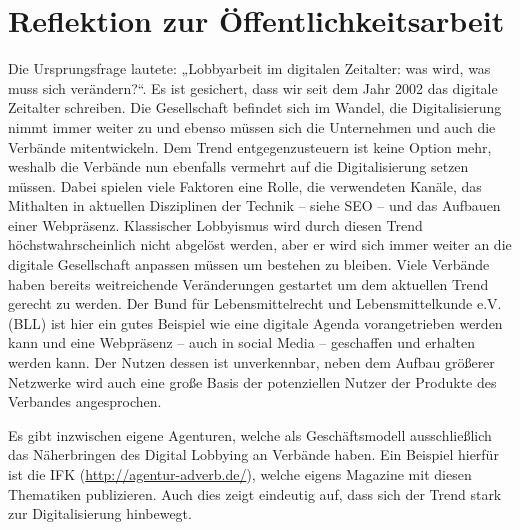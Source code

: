 \documentclass[12pt,a4paper,bibliography=totocnumbered,listof=totocnumbered]{scrartcl}
\begin{document}
\pagebreak

\section{Reflektion zur Öffentlichkeitsarbeit}

Die Ursprungsfrage lautete: „Lobbyarbeit im digitalen Zeitalter: was wird, was muss sich verändern?“. Es ist gesichert, dass wir seit dem Jahr 2002 das digitale Zeitalter schreiben. Die Gesellschaft befindet sich im Wandel, die Digitalisierung nimmt immer weiter zu und ebenso müssen sich die Unternehmen und auch die Verbände mitentwickeln. Dem Trend entgegenzusteuern ist keine Option mehr, weshalb die Verbände nun ebenfalls vermehrt auf die Digitalisierung setzen müssen. Dabei spielen viele Faktoren eine Rolle, die verwendeten Kanäle, das Mithalten in aktuellen Disziplinen der Technik – siehe SEO – und das Aufbauen einer Webpräsenz. Klassischer Lobbyismus wird durch diesen Trend höchstwahrscheinlich nicht abgelöst werden, aber er wird sich immer weiter      an die digitale Gesellschaft anpassen müssen um bestehen zu bleiben. 
Viele Verbände haben bereits weitreichende Veränderungen gestartet um dem aktuellen Trend gerecht zu werden. Der Bund für Lebensmittelrecht und Lebensmittelkunde e.V. (BLL) ist hier ein gutes Beispiel wie eine digitale Agenda vorangetrieben werden kann und eine Webpräsenz – auch in social Media – geschaffen und erhalten werden kann. Der Nutzen dessen ist unverkennbar, neben dem Aufbau größerer Netzwerke wird auch eine große Basis der potenziellen Nutzer der Produkte des Verbandes angesprochen.


Es gibt inzwischen eigene Agenturen, welche als Geschäftsmodell ausschließlich das Näher\-bringen des Digital Lobbying an Verbände haben. Ein Beispiel hierfür ist die IFK (\url{http://agentur-adverb.de/}), welche eigens Magazine mit diesen Thematiken publizieren. Auch dies zeigt eindeutig auf, dass sich der Trend stark zur Digitalisierung hinbewegt. 
\end{document}
